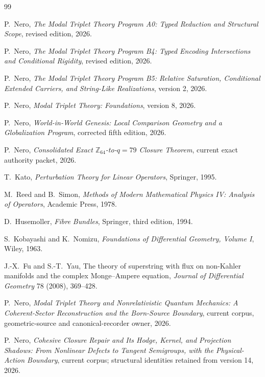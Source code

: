 \documentclass[11pt]{article}
\begin{document}
\begin{thebibliography}{99}

P.~Nero,
\newblock \emph{The Modal Triplet Theory Program A0: Typed Reduction and
Structural Scope},
\newblock revised edition, 2026.

P.~Nero,
\newblock \emph{The Modal Triplet Theory Program B4: Typed Encoding
Intersections and Conditional Rigidity},
\newblock revised edition, 2026.

P.~Nero,
\newblock \emph{The Modal Triplet Theory Program B5: Relative Saturation,
Conditional Extended Carriers, and String-Like Realizations},
\newblock version 2, 2026.

P.~Nero,
\newblock \emph{Modal Triplet Theory: Foundations},
\newblock version 8, 2026.

P.~Nero,
\newblock \emph{World-in-World Genesis: Local Comparison Geometry and a
Globalization Program},
\newblock corrected fifth edition, 2026.

P.~Nero,
\newblock \emph{Consolidated Exact $\mathbb Z_{64}$-to-$q=79$ Closure
Theorem},
\newblock current exact authority packet, 2026.

T.~Kato,
\newblock \emph{Perturbation Theory for Linear Operators},
\newblock Springer, 1995.

M.~Reed and B.~Simon,
\newblock \emph{Methods of Modern Mathematical Physics IV: Analysis of
Operators},
\newblock Academic Press, 1978.

D.~Husemoller,
\newblock \emph{Fibre Bundles},
\newblock Springer, third edition, 1994.

S.~Kobayashi and K.~Nomizu,
\newblock \emph{Foundations of Differential Geometry, Volume I},
\newblock Wiley, 1963.

J.-X.~Fu and S.-T.~Yau,
\newblock The theory of superstring with flux on non-Kahler manifolds and
the complex Monge--Ampere equation,
\newblock \emph{Journal of Differential Geometry} 78 (2008), 369--428.

P.~Nero,
\newblock \emph{Modal Triplet Theory and Nonrelativistic Quantum Mechanics:
A Coherent-Sector Reconstruction and the Born-Source Boundary},
\newblock current corpus, geometric-source and canonical-recorder owner, 2026.

P.~Nero,
\newblock \emph{Cohesive Closure Repair and Its Hodge, Kernel, and Projection
Shadows: From Nonlinear Defects to Tangent Semigroups, with the
Physical-Action Boundary},
\newblock current corpus; structural identities retained from version 14, 2026.


\end{thebibliography}
\end{document}
